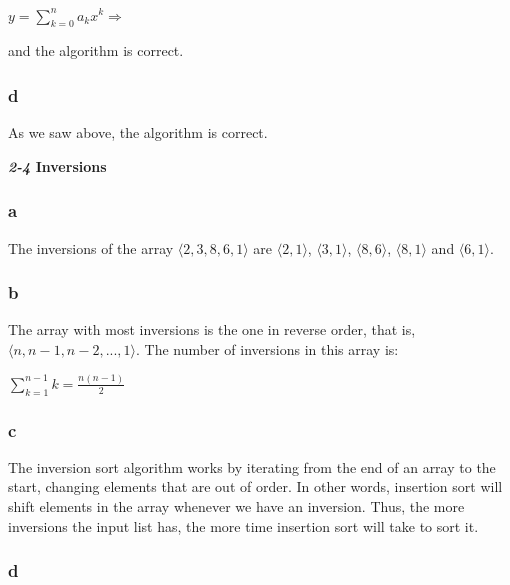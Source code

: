 \documentclass[8pt,a4paper]{article}
\begin{document}
\begin{center}
  $y = \sum_{k = 0}^{n} a_k x^k \Rightarrow$
\end{center}

and the algorithm is correct.

\subsubsection*{d}

As we saw above, the algorithm is correct.

\begin{framed}
\textbf{\textit{2-4} Inversions}
\end{framed}

\subsubsection*{a}

The inversions of the array $\langle 2, 3, 8, 6, 1 \rangle$ are $\langle 2, 1 \rangle$,
$\langle 3, 1 \rangle$, $\langle 8, 6 \rangle$, $\langle 8, 1 \rangle$ and $\langle 6, 1\rangle$.

\subsubsection*{b}

The array with most inversions is the one in reverse order, that is, $\langle n, n-1, n-2, ..., 1 \rangle$.
The number of inversions in this array is:

\begin{center}
  $\sum_{k=1}^{n-1} k = \frac{n(n-1)}{2}$
\end{center}

\subsubsection*{c}

The inversion sort algorithm works by iterating from the end of an array to the start, changing
elements that are out of order. In other words, insertion sort will shift elements in the array
whenever we have an inversion. Thus, the more inversions the input list has, the more time
insertion sort will take to sort it.

\subsubsection*{d}
\end{document}
